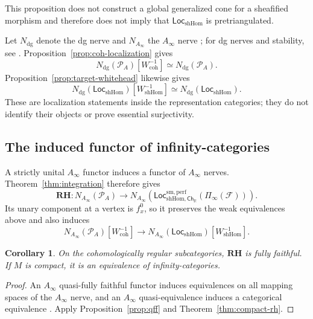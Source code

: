 \documentclass[12pt]{amsart}
\newtheorem{cor}[thm]{Corollary}
\theoremstyle{definition}
\theoremstyle{remark}
\numberwithin{equation}{section}
\newcommand{\CF}{{\mathcal F}}
\newcommand{\A}{{A}}
\newcommand{\R}{{\mathbb{R}}}
\newcommand{\1}{{\mathbb{1}}}
\newcommand{\Ch}{\mathsf{Ch}}
\newcommand{\Loc}{\mathsf{Loc}}
\begin{document}
This proposition does not construct a global generalized cone for a
sheafified morphism and therefore does not imply that
$\Loc_{\mathrm{shHom}}$ is pretriangulated.

Let $N_{\mathrm{dg}}$ denote the dg nerve and $N_{A_\infty}$ the
$A_\infty$ nerve \cite{Fao17}; for dg nerves and stability, see
\cite[Section 1.3.1]{LurHA}.  Proposition~\ref{prop:coh-localization}
gives
\[
 N_{\mathrm{dg}}(\mathcal P_{\A})
 [W_{\mathrm{coh}}^{-1}]
 \simeq
 N_{\mathrm{dg}}(\mathcal P_{\A}).
\]
Proposition~\ref{prop:target-whitehead} likewise gives
\[
 N_{\mathrm{dg}}(\Loc_{\mathrm{shHom}})
 [W_{\mathrm{shHom}}^{-1}]
 \simeq
 N_{\mathrm{dg}}(\Loc_{\mathrm{shHom}}).
\]
These are localization statements inside the representation
categories; they do not identify their objects or prove essential
surjectivity.

\subsection{The induced functor of infinity-categories}\label{sec:nerve}

A strictly unital $A_\infty$ functor induces a functor of
$A_\infty$ nerves.  Theorem~\ref{thm:integration} therefore gives
\[
 \mathbf{RH}:
 N_{A_\infty}(\mathcal P_{\A})
 \longrightarrow
 N_{A_\infty}\left(
 \Loc_{\mathrm{shHom},\Ch_{\R}}^{\mathrm{sm,perf}}
 (\Pi_\infty(\CF))\right).
\]
Its unary component at a vertex is $f_x^0$, so it preserves the weak
equivalences above and also induces
\[
 N_{A_\infty}(\mathcal P_{\A})[W_{\mathrm{coh}}^{-1}]
 \longrightarrow
 N_{A_\infty}(\Loc_{\mathrm{shHom}})
 [W_{\mathrm{shHom}}^{-1}].
\]

\begin{cor}\label{cor:nerve-rh}
On the cohomologically regular subcategories,
$\mathbf{RH}$ is fully faithful.  If $M$ is compact, it is an
equivalence of infinity-categories.
\end{cor}

\begin{proof}
An $A_\infty$ quasi-fully faithful functor induces equivalences on all
mapping spaces of the $A_\infty$ nerve, and an $A_\infty$
quasi-equivalence induces a categorical equivalence
\cite{Fao17}.  Apply Proposition~\ref{prop:qff} and
Theorem~\ref{thm:compact-rh}.
\end{proof}
\end{document}
